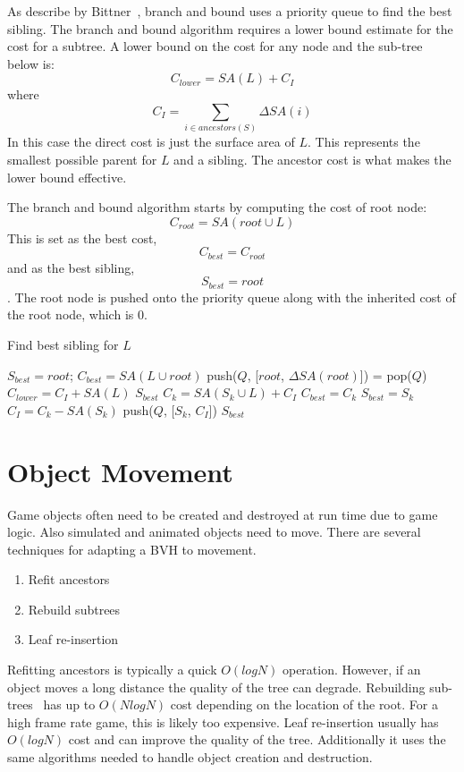 \documentclass{article}
\begin{document}
As describe by Bittner~\cite{Bittner2013}, branch and bound uses a priority queue to find the best sibling. The branch and bound algorithm requires a lower bound estimate for the cost for a subtree. A lower bound on the cost for any node and the sub-tree below is:
\begin{equation}
	C_{lower} = SA(L) + C_I
\end{equation}
where
\begin{equation}
	C_I = \sum_{i \in ancestors(S)} \Delta SA(i)
\end{equation}
In this case the direct cost is just the surface area of $L$. This represents the smallest possible parent for $L$ and a sibling. The ancestor cost is what makes the lower bound effective.

The branch and bound algorithm starts by computing the cost of root node:
\[ C_{root} = SA(root \cup L) \]
This is set as the best cost, \[C_{best} = C_{root} \] and as the best sibling, \[S_{best} = root\]. The root node is pushed onto the priority queue along with the inherited cost of the root node, which is $0$.

\begin{algorithm}
	\caption{Find best sibling for $L$}
	\label{alg:best_sibling}
	\begin{algorithmic}
		\STATE $S_{best} = root$;
		\STATE $C_{best} = SA(L \cup root)$
		\STATE push($Q$, [$root$, $\Delta SA(root)$])
		\STATE [$S$, $C_I$] = pop($Q$)
		\STATE $C_{lower} = C_I + SA(L)$
		\RETURN $S_{best}$
		\ENDIF
		\STATE $C_k = SA(S_k \cup L) + C_I$
		\STATE $C_{best} = C_k$
		\STATE $S_{best} = S_k$
		\ENDIF
		\STATE $C_I = C_k - SA(S_k)$
		\STATE push($Q$, [$S_k$, $C_I$])
		\ENDIF
		\ENDFOR
		\ENDWHILE
	\RETURN $S_{best}$
	\end{algorithmic}
\end{algorithm}

\section{Object Movement}

Game objects often need to be created and destroyed at run time due to game logic. Also simulated and animated objects need to move. There are several techniques for adapting a BVH to movement.
\begin{enumerate}
	\item Refit ancestors
	\item Rebuild subtrees
	\item Leaf re-insertion
\end{enumerate}
Refitting ancestors is typically a quick $O(log N)$ operation. However, if an object moves a long distance the quality of the tree can degrade. Rebuilding sub-trees~\cite{Larsson2006} has up to $O( N log N )$ cost depending on the location of the root. For a high frame rate game, this is likely too expensive. Leaf re-insertion usually has $O(log N)$ cost and can improve the quality of the tree. Additionally it uses the same algorithms needed to handle object creation and destruction.
\end{document}
